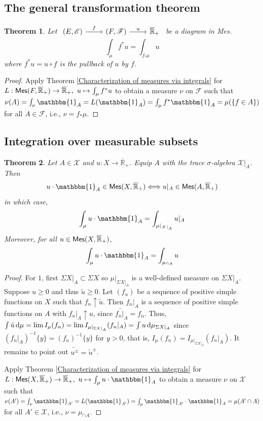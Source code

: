 \documentclass[11pt, a4paper, openany]{book}
\newtheorem{thm}{Theorem}\newtheorem{lem}{Lemma}\newtheorem{crl}{Corollary}
\theoremstyle{definition}
\newcommand{\cat}[1]{\textup{\textsf{#1}}}
\newcommand{\er}{\overline{\mathbb{R}}}
\begin{document}
\subsection{The general transformation theorem}
    \begin{thm}\label{the general transformation theorem}
        Let $\begin{tikzcd}
            (E,\mathscr{E}) \ar[r, "f"] & (F,\mathscr{F}) \ar[r, "u"] & \er_+
        \end{tikzcd}$ be a diagram in \cat{Mes}.
        \[\int_\mu f^* u=\int_{f_*\mu} u\]
        where $f^* u=u\circ f$ is the pullback of $u$ by $f$.
    \end{thm}
    \begin{proof}
        Apply Theorem \ref{Characterization of measures via integrals} for $L:\cat{Mes}(F,\er_+)\rightarrow \er_+,\,\,u\mapsto \int_\mu f^*u$ to obtain a measure $\nu$ on $\mathscr{F}$ such that $\nu(A)=\int_\nu \mathbbm{1}_{A}=L(\mathbbm{1}_{A})=\int_\mu f^*\mathbbm{1}_{A}=\mu(\{f\in A\})$ for all $A\in\mathscr{F}$, i.e., $\nu=f_*\mu$.
    \end{proof}
\subsection{Integration over measurable subsets}
    \begin{thm}
        Let $A\in\mathscr{X}$ and $u:X\rightarrow \er_+$. Equip $A$ with the trace $\sigma$-algebra $\mathscr{X}|_A$. Then
        \[
            u\cdot\mathbbm{1}_A\in\cat{Mes}(X,\er_+)\Longleftrightarrow u|_A\in\cat{Mes}(A,\er_+)
        \]
        in which case,
        \[
            \int_\mu u\cdot\mathbbm{1}_A=\int_{\mu|_{\mathscr{X}|_A}} u|_A
        \]
        Moreover, for all $u\in \cat{Mes}(X,\er_+)$,
        \[
            \int_\mu u\cdot\mathbbm{1}_A=\int_{\mu_{\cap A}}u
        \]
    \end{thm}
    \begin{proof}
        For $1$, first $\Sigma X|_A\subset \Sigma X$ so $\mu|_{\Sigma X|_A}$ is a well-defined measure on $\Sigma X|_A$. Suppose $u\geqslant 0$ and thus $\tilde{u}\geqslant 0$. Let $(f_n)$ be a sequence of positive simple functions on $X$ such that $f_n\uparrow \tilde{u}$. Then $f_n|_A$ is a sequence of positive simple functions on $A$ with $f_n|_A\uparrow u$, since $\widetilde{f_n|_A}=f_n$. Thus, $\int \tilde{u}\odif\mu=\lim I_\mu(f_n)=\lim I_{\mu|_{\Sigma X|_A}}(f_n|_A)=\int u\odif\mu_{\Sigma X|_A}$ since $(f_n|_A)^{-1}\{y\}=(f_n)^{-1}\{y\}$ for $y>0$, that is, $I_\mu(f_n)=I_{\mu|_{\Sigma X|_A}}(f_n|_A)$. It remains to point out $\widetilde{u^\pm}=\tilde{u}^\pm$.

        Apply Theorem \ref{Characterization of measures via integrals} for $L:\cat{Mes}(X,\er_+)\rightarrow \er_+,\,\,u\mapsto \int_\mu u\cdot\mathbbm{1}_A$ to obtain a measure $\nu$ on $\mathscr{X}$ such that $\nu(A')=\int_\nu \mathbbm{1}_{A'}=L(\mathbbm{1}_{A'})=\int_\mu\mathbbm{1}_{A'}\cdot\mathbbm{1}_{A}=\mu(A'\cap A)$ for all $A'\in\mathscr{X}$, i.e., $\nu=\mu_{\cap A}$.
    \end{proof}
\end{document}
